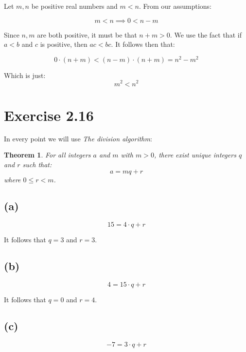 \documentclass{article}
\newtheorem*{theorem}{Theorem}
\begin{document}
Let $m,n$ be positive real numbers and $m < n$. From our assumptions:

\begin{equation*}
	m < n \implies 0 < n - m
\end{equation*}

Since $n,m$ are both positive, it must be that $n + m > 0$. We use the fact
that if $a<b$ and $c$ is positive, then $ac < bc$. It follows then
that:

\begin{equation*}
	0 \cdot (n+m) < (n-m) \cdot (n+m) = n^2 - m^2
\end{equation*}

Which is just:
\begin{equation*}
	m^2 < n^2
\end{equation*}



\section*{Exercise 2.16}

In every point we will use \textit{The division algorithm}:

\begin{theorem}
	For all integers $a$ and $m$ with $m > 0$, there exist unique integers
	$q$ and $r$ such that:
	\begin{equation*}
		a = mq + r
	\end{equation*} where $0 \leq r < m$.
\end{theorem}


\subsection*{(a)}

\begin{equation*}
	15 = 4 \cdot q + r
\end{equation*}

It follows that $q=3$ and $r=3$.

\subsection*{(b)}
\begin{equation*}
	4 = 15 \cdot q + r
\end{equation*}

It follows that $q=0$ and $r=4$.

\subsection*{(c)}
\begin{equation*}
	-7 = 3 \cdot q + r
\end{equation*}
\end{document}
